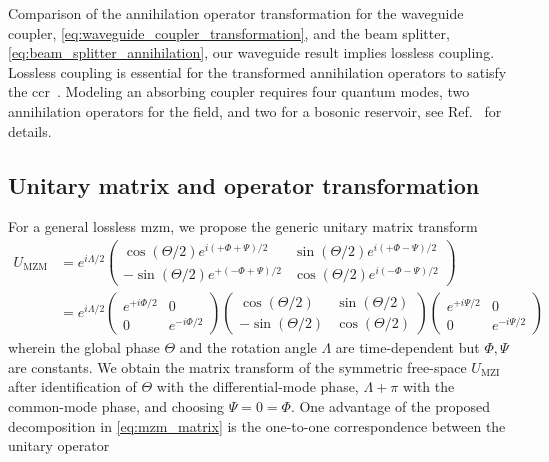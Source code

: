 Comparison of the annihilation operator transformation for the waveguide coupler, \cref{eq:waveguide_coupler_transformation}, and the beam splitter, \cref{eq:beam_splitter_annihilation}, our waveguide result implies lossless coupling.
Lossless coupling is essential for the transformed annihilation operators to satisfy the \gls{ccr}~\cite[p.~38]{Gerry2005}.
Modeling an absorbing coupler requires four quantum modes, two annihilation operators for the field, and two for a bosonic reservoir, see Ref.~\cite[p.~210]{Vogel2006} for details.

\subsection{Unitary matrix and operator transformation}

For a general lossless \gls{mzm}, we propose the generic unitary matrix transform~\cite[p.~95]{Leonhardt2010}
\begin{equation}
	\begin{split}
		U_\text{MZM}
		&=
		e^{i\Lambda/2}
		\begin{pmatrix}
			\cos(\Theta/2)e^{i(+\Phi+\Psi)/2} & \sin(\Theta/2)e^{i(+\Phi-\Psi)/2} \\
			-\sin(\Theta/2)e^{+(-\Phi+\Psi)/2} & \cos(\Theta/2)e^{i(-\Phi-\Psi)/2}
		\end{pmatrix}
		\\
		&=
		e^{i\Lambda/2}
		\begin{pmatrix}
			e^{+i\Phi/2} & 0 \\
			0 & e^{-i\Phi/2}
		\end{pmatrix}
		\begin{pmatrix}
			\cos(\Theta/2) & \sin(\Theta/2) \\
			-\sin(\Theta/2) & \cos(\Theta/2)
		\end{pmatrix}
		\begin{pmatrix}
			e^{+i\Psi/2} & 0 \\
			0 & e^{-i\Psi/2}
		\end{pmatrix}
	\end{split}
	\label{eq:mzm_matrix}
\end{equation}
wherein the global phase $\Theta$ and the rotation angle $\Lambda$ are time-dependent but $\Phi,\Psi$ are constants.
We obtain the matrix transform of the symmetric free-space $U_\text{MZI}$ after identification of $\Theta$ with the differential-mode phase, $\Lambda+\pi$ with the common-mode phase, and choosing $\Psi=0=\Phi$.
One advantage of the proposed decomposition in \cref{eq:mzm_matrix} is the one-to-one correspondence between the unitary operator~\cite[p.~99]{Leonhardt2010}
